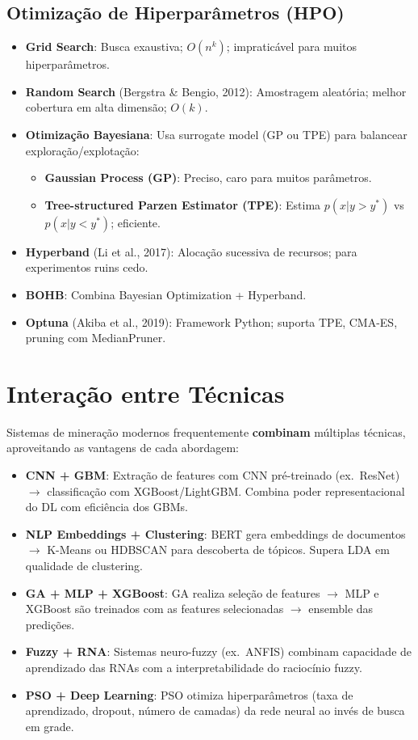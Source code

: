 \documentclass[12pt,a4paper]{article}
\begin{document}
\subsection{Otimização de Hiperparâmetros (HPO)}

\begin{itemize}
  \item \textbf{Grid Search}: Busca exaustiva; $O(n^k)$; impraticável para muitos hiperparâmetros.
  \item \textbf{Random Search} (Bergstra \& Bengio, 2012): Amostragem aleatória; melhor cobertura em alta dimensão; $O(k)$.
  \item \textbf{Otimização Bayesiana}: Usa surrogate model (GP ou TPE) para balancear exploração/explotação:
    \begin{itemize}
      \item \textbf{Gaussian Process (GP)}: Preciso, caro para muitos parâmetros.
      \item \textbf{Tree-structured Parzen Estimator (TPE)}: Estima $p(x|y > y^*)$ vs $p(x|y < y^*)$; eficiente.
    \end{itemize}
  \item \textbf{Hyperband} (Li et al., 2017): Alocação sucessiva de recursos; para experimentos ruins cedo.
  \item \textbf{BOHB}: Combina Bayesian Optimization + Hyperband.
  \item \textbf{Optuna} (Akiba et al., 2019): Framework Python; suporta TPE, CMA-ES, pruning com MedianPruner.
\end{itemize}

\section{Interação entre Técnicas}

Sistemas de mineração modernos frequentemente \textbf{combinam} múltiplas técnicas, aproveitando as vantagens de cada abordagem:

\begin{itemize}
  \item \textbf{CNN + GBM}: Extração de features com CNN pré-treinado (ex.\ ResNet) $\to$ classificação com XGBoost/LightGBM. Combina poder representacional do DL com eficiência dos GBMs.
  \item \textbf{NLP Embeddings + Clustering}: BERT gera embeddings de documentos $\to$ K-Means ou HDBSCAN para descoberta de tópicos. Supera LDA em qualidade de clustering.
  \item \textbf{GA + MLP + XGBoost}: GA realiza seleção de features $\to$ MLP e XGBoost são treinados com as features selecionadas $\to$ ensemble das predições.
  \item \textbf{Fuzzy + RNA}: Sistemas neuro-fuzzy (ex.\ ANFIS) combinam capacidade de aprendizado das RNAs com a interpretabilidade do raciocínio fuzzy.
  \item \textbf{PSO + Deep Learning}: PSO otimiza hiperparâmetros (taxa de aprendizado, dropout, número de camadas) da rede neural ao invés de busca em grade.
\end{itemize}
\end{document}
